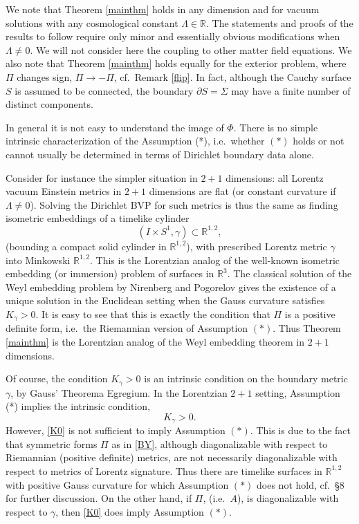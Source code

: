 \documentclass[10pt]{amsart}
\newcommand{\g}{\gamma}
\newcommand{\Si}{\Sigma}
\newcommand{\bR}{\mathbb R}
\newcommand{\be}{\begin{equation}}
\newcommand{\ee}{\end{equation}}
\newcommand{\p}{\partial}
\renewcommand{\to}{\rightarrow}
\newcommand{\<}{\langle}
\renewcommand{\>}{\rangle}
\theoremstyle{plain}
\theoremstyle{remark}
\theoremstyle{definition}
\numberwithin{equation}{section}
\begin{document}
\medskip 

  We note that Theorem \ref{mainthm} holds in any dimension and for vacuum solutions with any cosmological constant $\Lambda \in \bR$. The 
statements and proofs of the results to follow require only minor and essentially obvious modifications when $\Lambda \neq 0$. We will not consider 
here the coupling to other matter field equations. We also note that Theorem \ref{mainthm} holds equally for the exterior problem, where $\Pi$ changes sign, 
$\Pi \to -\Pi$, cf.~Remark \ref{flip}. In fact, although the Cauchy surface $S$ is assumed to be connected, the boundary $\p S = \Si$ may have a finite number 
of distinct components. 

\medskip 

  In general it is not easy to understand the image of $\Phi$. There is no simple intrinsic characterization of the Assumption (*), i.e.~whether $(*)$ holds or 
not cannot usually be determined in terms of Dirichlet boundary data alone. 
  
  Consider for instance the simpler situation in $2+1$ dimensions: all Lorentz vacuum Einstein metrics in $2+1$ dimensions are 
flat (or constant curvature if $\Lambda \neq 0$). Solving the Dirichlet BVP for such metrics is thus the same as finding isometric embeddings 
of a timelike cylinder 
$$(I \times S^1, \g) \subset \bR^{1,2},$$
(bounding a compact solid cylinder in $\bR^{1,2}$), with prescribed Lorentz metric $\g$ into Minkowski $\bR^{1,2}$. This is the Lorentzian analog of 
the well-known isometric embedding (or immersion) problem of surfaces in $\bR^3$. The classical solution of the Weyl embedding problem by Nirenberg 
and Pogorelov gives the existence of a unique solution in the Euclidean setting when the Gauss curvature satisfies $K_{\g} > 0$. It is easy to see that this 
is exactly the condition that $\Pi$ is a positive definite form, i.e.~the Riemannian version of Assumption $(*)$. Thus Theorem \ref{mainthm} is the 
Lorentzian analog of the Weyl embedding theorem in $2+1$ dimensions. 

   Of course, the condition $K_{\g} > 0$ is an intrinsic condition on the boundary metric $\g$, by Gauss' Theorema Egregium. In the Lorentzian $2+1$ 
setting, Assumption (*) implies the intrinsic condition, 
\be \label{K0}  
K_{\g} > 0. 
\ee  
However, \eqref{K0} is not sufficient to imply Assumption $(*)$. This is due to the fact that symmetric forms $\Pi$ as in \eqref{BY}, although diagonalizable with 
respect to Riemannian (positive definite) metrics, are not necessarily diagonalizable with respect to metrics of Lorentz signature. Thus there are timelike surfaces in 
$\bR^{1,2}$ with positive Gauss curvature for which Assumption $(*)$ does not hold, cf.~\S 8 for further discussion. On the other hand, if $\Pi$, (i.e.~$A$), is 
diagonalizable with respect to $\g$, then \eqref{K0} does imply Assumption $(*)$. 
 
\end{document}
